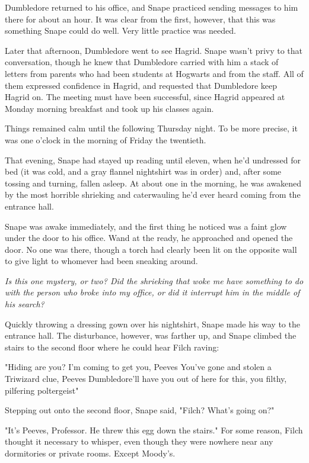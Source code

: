 Dumbledore returned to his office, and Snape practiced sending messages to him there for about an hour. It was clear from the first, however, that this was something Snape could do well. Very little practice was needed.

Later that afternoon, Dumbledore went to see Hagrid. Snape wasn't privy to that conversation, though he knew that Dumbledore carried with him a stack of letters from parents who had been students at Hogwarts and from the staff. All of them expressed confidence in Hagrid, and requested that Dumbledore keep Hagrid on. The meeting must have been successful, since Hagrid appeared at Monday morning breakfast and took up his classes again.

Things remained calm until the following Thursday night. To be more precise, it was one o'clock in the morning of Friday the twentieth.

That evening, Snape had stayed up reading until eleven, when he'd undressed for bed (it was cold, and a gray flannel nightshirt was in order) and, after some tossing and turning, fallen asleep. At about one in the morning, he was awakened by the most horrible shrieking and caterwauling he'd ever heard coming from the entrance hall.

Snape was awake immediately, and the first thing he noticed was a faint glow under the door to his office. Wand at the ready, he approached and opened the door. No one was there, though a torch had clearly been lit on the opposite wall to give light to whomever had been sneaking around.

\emph{Is this one mystery, or two? Did the shrieking that woke me have something to do with the person who broke into my office, or did it interrupt him in the middle of his search?}

Quickly throwing a dressing gown over his nightshirt, Snape made his way to the entrance hall. The disturbance, however, was farther up, and Snape climbed the stairs to the second floor where he could hear Filch raving:

"Hiding are you? I'm coming to get you, Peeves{\el} You've gone and stolen a Triwizard clue, Peeves{\el} Dumbledore'll have you out of here for this, you filthy, pilfering poltergeist{\el}"

Stepping out onto the second floor, Snape said, "Filch? What's going on?"

"It's Peeves, Professor. He threw this egg down the stairs." For some reason, Filch thought it necessary to whisper, even though they were nowhere near any dormitories or private rooms. Except Moody's.

